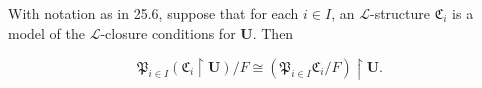 With notation as in 25.6, suppose that for each $i \in I$, an $\mathcal{L}$-structure $\mathfrak{C}_i$ is a model of the $\mathcal{L}$-closure conditions for $\mathbf{U}$. Then

$$\mathfrak{P}_{i \in I} (\mathfrak{C}_i \upharpoonright \mathbf{U}) / F \cong (\mathfrak{P}_{i \in I} \mathfrak{C}_i / F) \upharpoonright \mathbf{U}.$$
